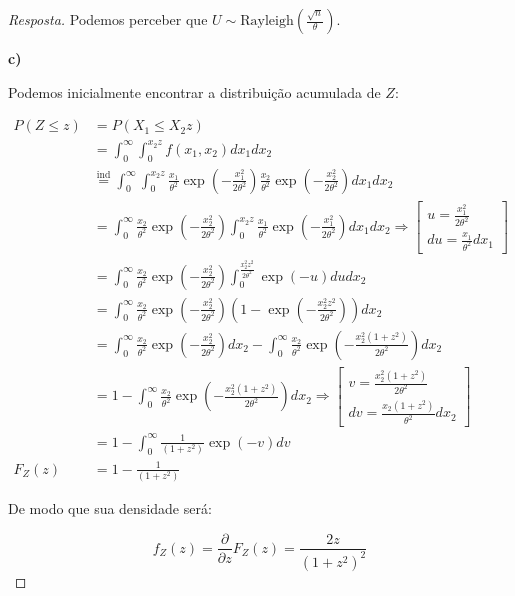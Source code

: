 \documentclass[
]{article}
\theoremstyle{definition}
\theoremstyle{definition}
\theoremstyle{definition}
\theoremstyle{definition}
\theoremstyle{remark}
\begin{document}
\begin{proof}[Resposta]
Podemos perceber que \(U \sim \mathrm{Rayleigh}\left(\frac{\sqrt{n}}{\theta}\right)\).

\textbf{c)}

Podemos inicialmente encontrar a distribuição acumulada de \(Z\):

\begin{align*}
P(Z \le z) &= P(X_{1} \le X_{2}z) \\
&= \int_{0}^{\infty}\int_{0}^{x_{2}z}f(x_{1},x_{2})dx_{1}dx_{2} \\
&\stackrel{\text{ind}}{=} \int_{0}^{\infty}\int_{0}^{x_{2}z}\frac{x_{1}}{\theta^{2}}\exp\left(-\frac{x_{1}^{2}}{2\theta^{2}}\right)\frac{x_{2}}{\theta^{2}}\exp\left(-\frac{x_{2}^{2}}{2\theta^{2}}\right)dx_{1}dx_{2} \\
&= \int_{0}^{\infty}\frac{x_{2}}{\theta^{2}}\exp\left(-\frac{x_{2}^{2}}{2\theta^{2}}\right)\int_{0}^{x_{2}z}\frac{x_{1}}{\theta^{2}}\exp\left(-\frac{x_{1}^{2}}{2\theta^{2}}\right)dx_{1}dx_{2} \Rightarrow \begin{bmatrix}
u = \frac{x_{1}^{2}}{2\theta^{2}} \\
du = \frac{x_{1}}{\theta^{2}}dx_{1}
\end{bmatrix} \\
&= \int_{0}^{\infty}\frac{x_{2}}{\theta^{2}}\exp\left(-\frac{x_{2}^{2}}{2\theta^{2}}\right)\int_{0}^{\frac{x_{2}^{2}z^{2}}{2\theta^{2}}}\exp\left(-u\right)dudx_{2} \\
&= \int_{0}^{\infty}\frac{x_{2}}{\theta^{2}}\exp\left(-\frac{x_{2}^{2}}{2\theta^{2}}\right)\left(1 - \exp\left(-\frac{x_{2}^{2}z^{2}}{2\theta^{2}}\right)\right)dx_{2} \\
&= \int_{0}^{\infty}\frac{x_{2}}{\theta^{2}}\exp\left(-\frac{x_{2}^{2}}{2\theta^{2}}\right)dx_{2} - \int_{0}^{\infty}\frac{x_{2}}{\theta^{2}}\exp\left(-\frac{x_{2}^{2}(1 + z^{2})}{2\theta^{2}}\right)dx_{2} \\
&= 1 - \int_{0}^{\infty}\frac{x_{2}}{\theta^{2}}\exp\left(-\frac{x_{2}^{2}(1 + z^{2})}{2\theta^{2}}\right)dx_{2} \Rightarrow \begin{bmatrix}
v = \frac{x_{2}^{2}(1+z^{2})}{2\theta^{2}} \\
dv = \frac{x_{2}(1+z^{2})}{\theta^{2}}dx_{2}
\end{bmatrix} \\
&= 1 - \int_{0}^{\infty}\frac{1}{(1+z^{2})}\exp(-v)dv \\
F_{Z}(z) &= 1 - \frac{1}{(1 + z^{2})}
\end{align*}

De modo que sua densidade será:

\begin{equation*}
f_{Z}(z) = \frac{\partial}{\partial z}F_{Z}(z) = \frac{2z}{(1 + z^{2})^{2}}
\end{equation*}
\end{proof}
\end{document}
